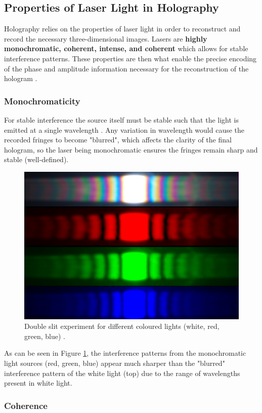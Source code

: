 \documentclass[12pt]{article}
\begin{document}
\subsection{Properties of Laser Light in Holography}

Holography relies on the properties of laser light in order to reconstruct and record the necessary three-dimensional images. Lasers are \textbf{highly monochromatic, coherent, intense, and coherent} which allows for stable
interference patterns. These properties are then what enable the precise encoding of the phase and amplitude information necessary for the reconstruction of the hologram \cite{UCDholo}.

\subsubsection{Monochromaticity}

For stable interference the source itself must be stable such that the light is emitted at a single wavelength \cite{princelaser}.
Any variation in wavelength would cause the recorded fringes to become "blurred", which affects the clarity of the final hologram, so the laser being monochromatic ensures the fringes remain sharp and stable (well-defined).

\begin{figure}[H]
    \centering
    \includegraphics[width=.5\textwidth]{interference patterns.jpg}
    \caption{\centering Double slit experiment for different coloured lights (white, red, green, blue) \protect\cite{holoimg2}.}
    \label{fig:4}
\end{figure}

As can be seen in Figure \ref{fig:4}, the interference patterns from the monochromatic light sources (red, green, blue) appear much sharper than the "blurred" interference pattern of the white light (top)
due to the range of wavelengths present in white light.

\subsubsection{Coherence}
\end{document}
